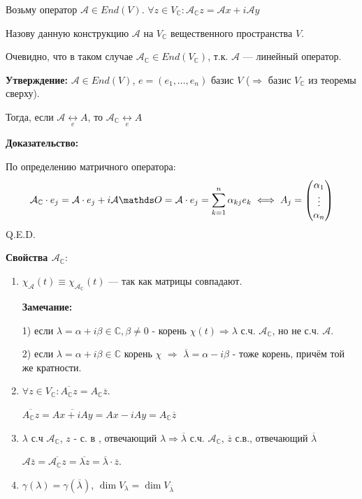  Возьму оператор $\mathcal{A} \in End(V)$.  $\forall z \in V_{\mathbb{C}}: \mathcal{A}_{\mathbb{C}}z =\mathcal{A}x + i \mathcal{A}y$

Назову данную конструкцию  $\mathcal{A}$ на $V_{\mathbb{C}}$ вещественного пространства $V$.

Очевидно, что в таком случае $\mathcal{A}_\mathbb{C} \in End(V_{\mathbb{C}})$, т.к. $\mathcal{A}$ --- линейный оператор.

\textbf{Утверждение:} $\mathcal{A} \in End(V)$, $e = (e_1,\ldots, e_n) $ базис $V$ ($\Rightarrow$ базис $V_{\mathbb{C}}$ из теоремы сверху).


Тогда, если $\mathcal{A} \underset{e} \leftrightarrow A$, то $ \mathcal{A}_{\mathbb{C}} \underset{e} \leftrightarrow A$

\textbf{Доказательство:}

По определению матричного оператора:
$$\mathcal{A}_{\mathbb{C}}  \cdot e_j = \mathcal{A}  \cdot e_j + i\mathcal{A} \zero = \mathcal{A} \cdot e_j =\sum\limits_{k=1}^n \alpha_{kj}e_k \iff A_j = \begin{pmatrix}
    \alpha_1\\
    \vdots \\
    \alpha_n
\end{pmatrix}$$
\hfill Q.E.D.


\textbf{Свойства $\mathcal{A_\mathbb{C}}$}:

\begin{enumerate}
   \item $\chi_{\mathcal{A}} (t) \equiv \chi_\mathcal{A_\mathbb{C}}(t)$ --- так как матрицы совпадают.

    \textbf{Замечание:}

    1) если $\lambda = \alpha + i\beta \in \mathbb{C}, \beta \neq 0$ - корень $\chi(t) \Rightarrow \lambda$ с.ч. $\mathcal{A_\mathbb{C}}$, но не с.ч. $\mathcal{A}$.

   2) если $\lambda = \alpha + i\beta \in \mathbb{C}$ корень $\chi$ $\Rightarrow$ $\overline{\lambda}=\alpha - i\beta$ - тоже корень, причём той же кратности.

    \item $\forall z \in V_{\mathbb{C}}: \overline{A_{\mathbb{C}}z } = A_{\mathbb{C}}\overline{z}$.

     $\overline{A_{\mathbb{C}}z} = \overline{Ax + iAy} = Ax - iAy = A_{\mathbb{C}}\overline{z}$

    \item $\lambda$ с.ч $\mathcal{A_\mathbb{C}} $, $z$ - с. в , отвечающий $\lambda \Rightarrow \overline{\lambda}$ с.ч. $\mathcal{A_\mathbb{C}}$, $\overline{z}$ с.в., отвечающий $\overline{\lambda}$

    $\mathcal{A}\overline{z} = \overline{\mathcal{A}_{\mathbb{C}}z} = \overline{\lambda z} = \overline{\lambda} \cdot \overline{z}$.

    \item $\gamma(\lambda) = \gamma(\overline{\lambda})$, $\dim V_{\lambda} = \dim V_{\overline{\lambda}}$
\end{enumerate}

